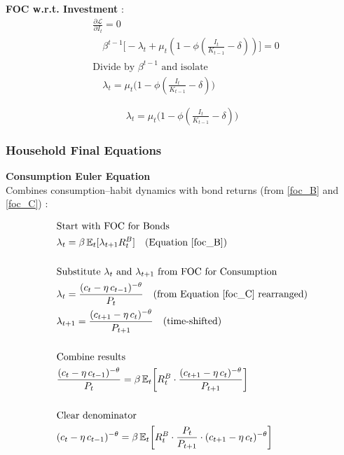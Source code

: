 \documentclass[11pt,preprint]{elsarticle}
\numberwithin{equation}{section}
\numberwithin{figure}{section}
\numberwithin{table}{section}
\begin{document}
\textbf{FOC w.r.t. Investment} : \begin{align*}
  & \frac{\partial \mathcal{L}}{\partial I_t} = 0 \\
  & \quad \beta^{t-1}\bigl[-\lambda_t + \mu_t(1 - \phi(\tfrac{I_t}{K_{t-1}} - \delta))\bigr] = 0 \\[6pt]
  & \text{Divide by }\beta^{t-1}\text{ and isolate} \\
  & \quad \lambda_t = \mu_t\bigl(1 - \phi(\tfrac{I_t}{K_{t-1}} - \delta)\bigr)
\end{align*}

\begin{equation}\label{foc_I}
\boxed{\lambda_t = \mu_t\bigl(1 - \phi(\tfrac{I_t}{K_{t-1}} - \delta)\bigr)}
\end{equation}

\subsubsection{Household Final
Equations}\label{household-final-equations}

\textbf{Consumption Euler Equation}\\
Combines consumption--habit dynamics with bond returns (from
\eqref{foc_B} and \eqref{foc_C}) :

\begin{align*}
& \text{Start with FOC for Bonds} \\
& \lambda_t = \beta\,\mathbb{E}_t[\lambda_{t+1}R_t^B] \quad \text{(Equation \ref{foc_B})} \\
& \\
& \text{Substitute } \lambda_t \text{ and } \lambda_{t+1} \text{ from FOC for Consumption} \\
& \lambda_t = \frac{(c_t - \eta\,c_{t-1})^{-\theta}}{P_t} \quad \text{(from Equation \ref{foc_C} rearranged)} \\
& \lambda_{t+1} = \frac{(c_{t+1} - \eta\,c_t)^{-\theta}}{P_{t+1}} \quad \text{(time-shifted)} \\
& \\
& \text{Combine results} \\
& \frac{(c_t - \eta\,c_{t-1})^{-\theta}}{P_t} = \beta\,\mathbb{E}_t\!\left[ R_t^B \cdot \frac{(c_{t+1} - \eta\,c_t)^{-\theta}}{P_{t+1}} \right] \\
& \\
& \text{Clear denominator} \\
& (c_t - \eta\,c_{t-1})^{-\theta} = \beta\,\mathbb{E}_t\!\left[ R_t^B \cdot \frac{P_t}{P_{t+1}} \cdot (c_{t+1} - \eta\,c_t)^{-\theta} \right]
\end{align*}
\end{document}
